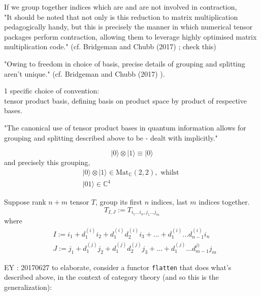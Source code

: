 If we group together indices which are and are not involved in contraction, \\
"It should be noted that not only is this reduction to matrix multiplication pedagogically handy, but this is precisely the manner in which numerical tensor packages perform contraction, allowing them to leverage highly optimised matrix multiplication code." (cf. Bridgeman and Chubb (2017) \cite{agat:BrCh2017}; check this)

"Owing to freedom in choice of basis, precise details of grouping and splitting aren't unique." (cf. Bridgeman and Chubb (2017) \cite{agat:BrCh2017}).  

1 specific choice of convention:  \\
tensor product basis, defining basis on product space by product of respective bases.  

"The canonical use of tensor product bases in quantum information allows for grouping and splitting described above to be - dealt with implicitly."  


\begin{equation}
 | 0 \rangle \otimes | 1 \rangle \equiv | 0 \rangle 
\end{equation} and precisely this grouping, 
\begin{equation}
\begin{gathered}
	| 0 \rangle \otimes | 1 \rangle \in \text{Mat}_{\mathbb{C}}(2,2), \text{ whilst } \\ 
 | 0 1 \rangle \in \mathbb{C}^4  
\end{gathered}
\end{equation}

Suppose rank $n+m$ tensor $T$, group its first $n$ indices, last $m$ indices together.
\[
T_{I,J} := T_{i_1\dots i_n,j_1\dots j_m}
\]
where 
\[
\begin{aligned}
	& I := i_1 + d_1^{(i)} i_2 + d_1^{(i)}  d_2^{(i)} i_3 + \dots + d_1^{(i)} \dots d_{n-1}^{(i)} i_n \\ 
	& J := j_1 + d_1^{(j)} j_2 + d_1^{(j)}  d_2^{(j)} j_3 + \dots + d_1^{(j)} \dots d_{m-1}^{j)} j_m 
\end{aligned}
\]

EY : 20170627 to elaborate, consider a functor \verb|flatten| that does what's described above, in the context of category theory (and so this is the generalization):

